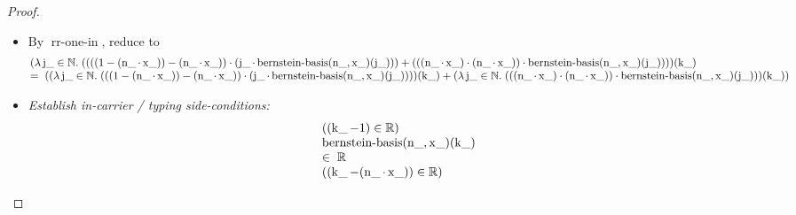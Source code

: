 \documentclass[11pt]{article}
\theoremstyle{plain}
\begin{document}
\begin{proof}
\begin{itemize}[leftmargin=2.8em, itemsep=4pt, parsep=1pt]
  \item[\textbf{94}] By $\operatorname{rr\text{-}one\text{-}in}$, reduce to
\begin{equation*}
\begin{array}{@{}l@{}} (\lambda \operatorname{j\_} \in \mathbb{N}.\; ((((1 - (\operatorname{n\_} \cdot \operatorname{x\_})) - (\operatorname{n\_} \cdot \operatorname{x\_})) \cdot (\operatorname{j\_} \cdot \operatorname{bernstein\text{-}basis}(\operatorname{n\_}, \operatorname{x\_})(\operatorname{j\_}))) + (((\operatorname{n\_} \cdot \operatorname{x\_}) \cdot (\operatorname{n\_} \cdot \operatorname{x\_})) \cdot \operatorname{bernstein\text{-}basis}(\operatorname{n\_}, \operatorname{x\_})(\operatorname{j\_}))))(\operatorname{k\_}) \\ =\; ((\lambda \operatorname{j\_} \in \mathbb{N}.\; (((1 - (\operatorname{n\_} \cdot \operatorname{x\_})) - (\operatorname{n\_} \cdot \operatorname{x\_})) \cdot (\operatorname{j\_} \cdot \operatorname{bernstein\text{-}basis}(\operatorname{n\_}, \operatorname{x\_})(\operatorname{j\_}))))(\operatorname{k\_}) + (\lambda \operatorname{j\_} \in \mathbb{N}.\; (((\operatorname{n\_} \cdot \operatorname{x\_}) \cdot (\operatorname{n\_} \cdot \operatorname{x\_})) \cdot \operatorname{bernstein\text{-}basis}(\operatorname{n\_}, \operatorname{x\_})(\operatorname{j\_})))(\operatorname{k\_})) \end{array}
\end{equation*}

  \item[\textbf{95--97}] \emph{Establish in-carrier / typing side-conditions:}
\begin{equation*}
\begin{array}{@{}l@{}}
((\operatorname{k\_} - 1) \in \mathbb{R}) \\
\begin{array}{@{}l@{}} \operatorname{bernstein\text{-}basis}(\operatorname{n\_}, \operatorname{x\_})(\operatorname{k\_}) \\ \in\; \mathbb{R} \end{array} \\
((\operatorname{k\_} - (\operatorname{n\_} \cdot \operatorname{x\_})) \in \mathbb{R})
\end{array}
\end{equation*}


\end{itemize}
\end{proof}
\end{document}
